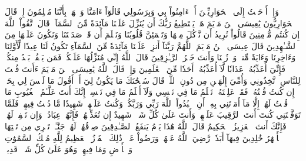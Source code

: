 وَإِذۡ أَوۡحَيۡتُ إِلَى ٱلۡحَوَارِيِّـۧنَ أَنۡ ءَامِنُواْ بِي وَبِرَسُولِي قَالُوٓاْ ءَامَنَّا وَٱشۡهَدۡ بِأَنَّنَا مُسۡلِمُونَ
إِذۡ قَالَ ٱلۡحَوَارِيُّونَ يَٰعِيسَى ٱبۡنَ مَرۡيَمَ هَلۡ يَسۡتَطِيعُ رَبُّكَ أَن يُنَزِّلَ عَلَيۡنَا مَآئِدَةٗ مِّنَ ٱلسَّمَآءِۖ قَالَ ٱتَّقُواْ ٱللَّهَ إِن كُنتُم مُّؤۡمِنِينَ
قَالُواْ نُرِيدُ أَن نَّأۡكُلَ مِنۡهَا وَتَطۡمَئِنَّ قُلُوبُنَا وَنَعۡلَمَ أَن قَدۡ صَدَقۡتَنَا وَنَكُونَ عَلَيۡهَا مِنَ ٱلشَّـٰهِدِينَ
قَالَ عِيسَى ٱبۡنُ مَرۡيَمَ ٱللَّهُمَّ رَبَّنَآ أَنزِلۡ عَلَيۡنَا مَآئِدَةٗ مِّنَ ٱلسَّمَآءِ تَكُونُ لَنَا عِيدٗا لِّأَوَّلِنَا وَءَاخِرِنَا وَءَايَةٗ مِّنكَۖ وَٱرۡزُقۡنَا وَأَنتَ خَيۡرُ ٱلرَّـٰزِقِينَ
قَالَ ٱللَّهُ إِنِّي مُنَزِّلُهَا عَلَيۡكُمۡۖ فَمَن يَكۡفُرۡ بَعۡدُ مِنكُمۡ فَإِنِّيٓ أُعَذِّبُهُۥ عَذَابٗا لَّآ أُعَذِّبُهُۥٓ أَحَدٗا مِّنَ ٱلۡعَٰلَمِينَ
وَإِذۡ قَالَ ٱللَّهُ يَٰعِيسَى ٱبۡنَ مَرۡيَمَ ءَأَنتَ قُلۡتَ لِلنَّاسِ ٱتَّخِذُونِي وَأُمِّيَ إِلَٰهَيۡنِ مِن دُونِ ٱللَّهِۖ قَالَ سُبۡحَٰنَكَ مَا يَكُونُ لِيٓ أَنۡ أَقُولَ مَا لَيۡسَ لِي بِحَقٍّۚ إِن كُنتُ قُلۡتُهُۥ فَقَدۡ عَلِمۡتَهُۥۚ تَعۡلَمُ مَا فِي نَفۡسِي وَلَآ أَعۡلَمُ مَا فِي نَفۡسِكَۚ إِنَّكَ أَنتَ عَلَّـٰمُ ٱلۡغُيُوبِ
مَا قُلۡتُ لَهُمۡ إِلَّا مَآ أَمَرۡتَنِي بِهِۦٓ أَنِ ٱعۡبُدُواْ ٱللَّهَ رَبِّي وَرَبَّكُمۡۚ وَكُنتُ عَلَيۡهِمۡ شَهِيدٗا مَّا دُمۡتُ فِيهِمۡۖ فَلَمَّا تَوَفَّيۡتَنِي كُنتَ أَنتَ ٱلرَّقِيبَ عَلَيۡهِمۡۚ وَأَنتَ عَلَىٰ كُلِّ شَيۡءٖ شَهِيدٌ
إِن تُعَذِّبۡهُمۡ فَإِنَّهُمۡ عِبَادُكَۖ وَإِن تَغۡفِرۡ لَهُمۡ فَإِنَّكَ أَنتَ ٱلۡعَزِيزُ ٱلۡحَكِيمُ
قَالَ ٱللَّهُ هَٰذَا يَوۡمُ يَنفَعُ ٱلصَّـٰدِقِينَ صِدۡقُهُمۡۚ لَهُمۡ جَنَّـٰتٞ تَجۡرِي مِن تَحۡتِهَا ٱلۡأَنۡهَٰرُ خَٰلِدِينَ فِيهَآ أَبَدٗاۖ رَّضِيَ ٱللَّهُ عَنۡهُمۡ وَرَضُواْ عَنۡهُۚ ذَٰلِكَ ٱلۡفَوۡزُ ٱلۡعَظِيمُ
لِلَّهِ مُلۡكُ ٱلسَّمَٰوَٰتِ وَٱلۡأَرۡضِ وَمَا فِيهِنَّۚ وَهُوَ عَلَىٰ كُلِّ شَيۡءٖ قَدِيرُۢ